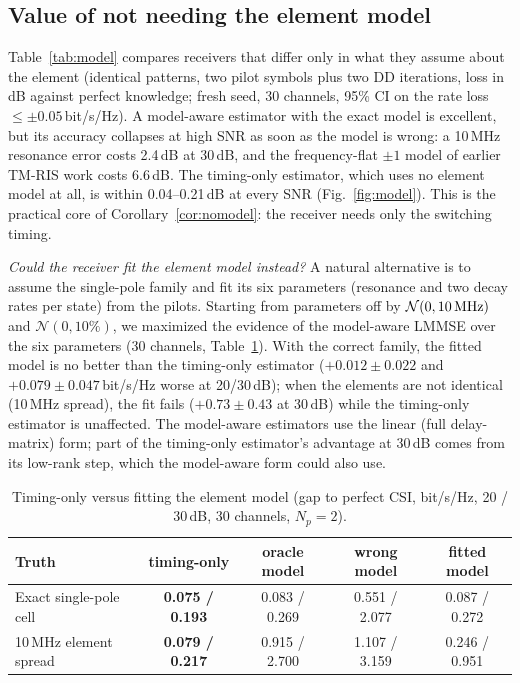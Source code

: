 \subsection{Value of not needing the element model}\label{sec:res-model}
Table~\ref{tab:model} compares receivers that differ only in what they assume about the
element (identical patterns, two pilot symbols plus two DD iterations, loss in dB against
perfect knowledge; fresh seed, 30 channels, 95\% CI on the rate loss $\le\pm0.05$\,bit/s/Hz).
A model-aware estimator with the exact model is excellent, but its accuracy collapses at high
SNR as soon as the model is wrong: a 10\,MHz resonance error costs 2.4\,dB at 30\,dB, and the
frequency-flat $\pm1$ model of earlier TM-RIS work costs 6.6\,dB. The timing-only estimator,
which uses no element model at all, is within 0.04--0.21\,dB at every SNR
(Fig.~\ref{fig:model}). This is the practical core of Corollary~\ref{cor:nomodel}: the
receiver needs only the switching timing.

\emph{Could the receiver fit the element model instead?} A natural alternative is to assume the single-pole
family and fit its six parameters (resonance and two decay rates per state) from the pilots. Starting from parameters
off by $\mathcal N(0,10\,{\rm MHz})$ and $\mathcal N(0,10\%)$, we maximized the evidence of the model-aware LMMSE over the
six parameters (30 channels, Table~\ref{tab:param}). With the correct family, the fitted model is no better than the
timing-only estimator ($+0.012\pm0.022$ and $+0.079\pm0.047$\,bit/s/Hz worse at 20/30\,dB); when the elements are not
identical (10\,MHz spread), the fit fails ($+0.73\pm0.43$ at 30\,dB) while the timing-only estimator is unaffected. The
model-aware estimators use the linear (full delay-matrix) form; part of the timing-only estimator's advantage at 30\,dB
comes from its low-rank step, which the model-aware form could also use.

\begin{table}[!htbp]\centering
\caption{Timing-only versus fitting the element model (gap to perfect CSI, bit/s/Hz, 20 / 30\,dB, 30 channels, $N_p=2$).}\label{tab:param}
\begin{tabular}{lcccc}\toprule
Truth & timing-only & oracle model & wrong model & fitted model \\\midrule
Exact single-pole cell & \textbf{0.075 / 0.193} & 0.083 / 0.269 & 0.551 / 2.077 & 0.087 / 0.272 \\
10\,MHz element spread & \textbf{0.079 / 0.217} & 0.915 / 2.700 & 1.107 / 3.159 & 0.246 / 0.951 \\\bottomrule
\end{tabular}
\end{table}


